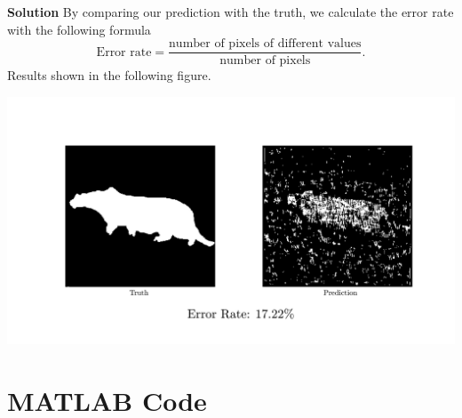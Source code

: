 \documentclass{article}
\begin{document}
\textbf{\large Solution}
By comparing our prediction with the truth, we calculate the error rate with the following formula
\[
  \text{Error rate} = \frac{\text{number of pixels of different values}}{\text{number of pixels}}.
\]
Results shown in the following figure.
\begin{center}
  \includegraphics[scale=0.1]{comparison}
\end{center}

\section*{MATLAB Code}
\end{document}
